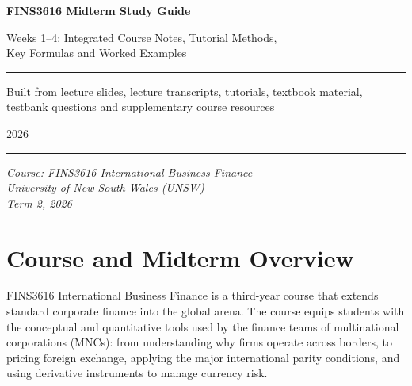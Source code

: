 \documentclass[11pt,a4paper]{article}
\begin{document}

\thispagestyle{empty}
\begin{center}
\vspace*{3cm}
{\fontsize{26}{32}\bfseries\color{HeadingColor} FINS3616 Midterm Study Guide\par}
\vspace{0.6cm}
{\large\color{HeadingColor} Weeks 1--4: Integrated Course Notes, Tutorial Methods,\\ Key Formulas and Worked Examples\par}
\vspace{0.5cm}
\rule{0.6\textwidth}{0.8pt}
\vspace{0.4cm}

{\normalsize Built from lecture slides, lecture transcripts, tutorials, textbook material,\\
testbank questions and supplementary course resources\par}
\vspace{0.4cm}
{\normalsize 2026\par}
\vspace{1.5cm}
\rule{0.6\textwidth}{0.4pt}
\vspace{0.4cm}

{\small\itshape Course: FINS3616 International Business Finance\\
University of New South Wales (UNSW)\\
Term 2, 2026\par}
\end{center}
\newpage

\tableofcontents
\newpage
{}

\section{Course and Midterm Overview}

FINS3616 International Business Finance is a third-year course that extends standard corporate finance into the global arena. The course equips students with the conceptual and quantitative tools used by the finance teams of multinational corporations (MNCs): from understanding why firms operate across borders, to pricing foreign exchange, applying the major international parity conditions, and using derivative instruments to manage currency risk.
\end{document}
